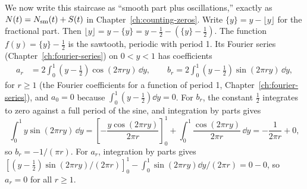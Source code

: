 We now write this staircase as ``smooth part plus oscillations,'' exactly as $N(t)=N_{\mathrm{sm}}(t)+S(t)$ in Chapter~\ref{ch:counting-zeros}. Write $\{y\}=y-\lfloor y\rfloor$ for the fractional part. Then $\lfloor y\rfloor=y-\{y\}=y-\tfrac12-\left(\{y\}-\tfrac12\right)$. The function $f(y)=\{y\}-\tfrac12$ is the sawtooth, periodic with period 1. Its Fourier series (Chapter~\ref{ch:fourier-series}) on $0<y<1$ has coefficients
\begin{align}
a_r&=2\int_0^1\left(y-\tfrac12\right)\cos(2\pi ry)\,\dd y,\qquad b_r=2\int_0^1\left(y-\tfrac12\right)\sin(2\pi ry)\,\dd y,
\end{align}
for $r\ge1$ (the Fourier coefficients for a function of period 1, Chapter~\ref{ch:fourier-series}), and $a_0=0$ because $\int_0^1(y-\tfrac12)\dd y=0$. For $b_r$, the constant $\tfrac12$ integrates to zero against a full period of the sine, and integration by parts gives
\begin{equation}
\int_0^1 y\sin(2\pi ry)\,\dd y=\left[-\frac{y\cos(2\pi ry)}{2\pi r}\right]_0^1+\int_0^1\frac{\cos(2\pi ry)}{2\pi r}\,\dd y=-\frac{1}{2\pi r}+0,
\end{equation}
so $b_r=-1/(\pi r)$. For $a_r$, integration by parts gives $\left[(y-\tfrac12)\sin(2\pi ry)/(2\pi r)\right]_0^1-\int_0^1\sin(2\pi ry)\dd y/(2\pi r)=0-0$, so $a_r=0$ for all $r\ge1$.

